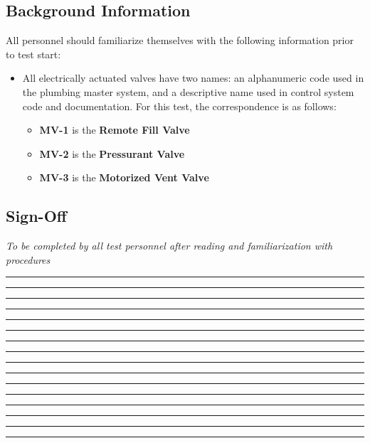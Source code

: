 \subsection{Background Information}
All personnel should familiarize themselves with the following information prior to test start:
\begin{itemize}
    \item All electrically actuated valves have two names: an alphanumeric code used in the plumbing master system, and a descriptive name used in control system code and documentation. For this test, the correspondence is as follows:
    \begin{itemize}
    	\item \textbf{MV-1} is the \textbf{Remote Fill Valve}
	    \item \textbf{MV-2} is the \textbf{Pressurant Valve}
	    \item \textbf{MV-3} is the \textbf{Motorized Vent Valve}
	\end{itemize}
\end{itemize}

\subsection{Sign-Off}
\textit{To be completed by all test personnel after reading and familiarization with procedures}
\begin{checklist}
    \item \opsfull      \tabto{25em}\rule{10em}{0.4pt}\hspace{5em}\rule{10em}{0.4pt}
    \item \primaryfull  \tabto{25em}\rule{10em}{0.4pt}\hspace{5em}\rule{10em}{0.4pt}
    \item \secondaryfull\tabto{25em}\rule{10em}{0.4pt}\hspace{5em}\rule{10em}{0.4pt}
    \item \daqfull      \tabto{25em}\rule{10em}{0.4pt}\hspace{5em}\rule{10em}{0.4pt}
    \item \controlfull  \tabto{25em}\rule{10em}{0.4pt}\hspace{5em}\rule{10em}{0.4pt}
    \item \perifull     \tabto{25em}\rule{10em}{0.4pt}\hspace{5em}\rule{10em}{0.4pt}
    \item \periifull    \tabto{25em}\rule{10em}{0.4pt}\hspace{5em}\rule{10em}{0.4pt}
    \item \periiifull   \tabto{25em}\rule{10em}{0.4pt}\hspace{5em}\rule{10em}{0.4pt}
\end{checklist}
\setcounter{checklistnum}{0}

